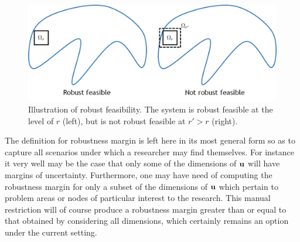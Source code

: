 \begin{figure}[htp!]
\begin{center}
\includegraphics[scale=1]{Figures/Robfeas} %
\end{center}
\caption{Illustration of robust feasibility.
The system is robust feasible at the level of $r$ (left), but is not robust feasible at $r' > r$ (right).}
\label{fig:RFeas}
\end{figure}

The definition for robustness margin is left here in its most general form so as to capture all scenarios under which a researcher may find themselves. 
For instance it very well may be the case that only some of the dimensions of $\mathbf{u}$ will have margins of uncertainty. 
Furthermore, one may have need of computing the robustness margin for only a subset of the dimensions of $\mathbf{u}$ which pertain to problem areas or nodes of particular interest to the research. 
This manual restriction will of course produce a robustness margin greater than or equal to that obtained by considering all dimensions, which certainly remains an option under the current setting. 
